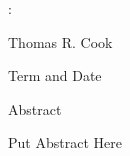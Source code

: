 
\thispagestyle{empty}
{ \phantom{.} \vspace*{\fill}}
\begin{center}
	{\Large\scshape \mytitle:}\\
        {\large\scshape \mysubtitle}
	
	Thomas R. Cook
	
	{Term and Date}
\end{center}
\vspace*{\fill}
\clearpage
\thispagestyle{empty}
{ \phantom{.} \vspace*{\fill}}
\begin{center}
{\Large Abstract}
\end{center}
\label{abstract}
\singlespacing
Put Abstract Here 






\vspace*{\fill}
